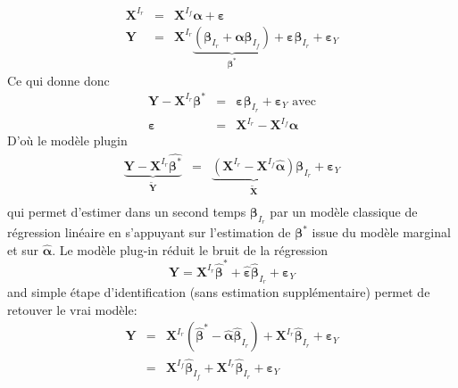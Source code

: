 \documentclass[12pt,a4paper]{report}
\begin{document}
\begin{eqnarray}
			\boldsymbol{X}^{I_r}&=&\boldsymbol{X}^{I_f}\boldsymbol{\alpha}+\boldsymbol{\varepsilon} \\
			\boldsymbol{Y}&=& \boldsymbol{X}^{I_r}\underbrace{(\boldsymbol{\beta}_{I_r}+\boldsymbol{\alpha}\boldsymbol{\beta}_{I_f})}_{\boldsymbol{\beta}^*}+\boldsymbol{\varepsilon}\boldsymbol{\beta}_{I_r}+\boldsymbol{\varepsilon}_Y 
					\end{eqnarray}		 
Ce qui donne donc
		\begin{eqnarray}
			\boldsymbol{Y}- \boldsymbol{X}^{I_r}\boldsymbol{\beta}^*&=&\boldsymbol{\varepsilon}\boldsymbol{\beta}_{I_r}+\boldsymbol{\varepsilon}_Y \textrm{ avec}\\
			\boldsymbol{\varepsilon}&=&\boldsymbol{X}^{I_r}-\boldsymbol{X}^{I_f}\boldsymbol{\alpha}
		\end{eqnarray}		 
D'où le modèle plugin 
		\begin{eqnarray}
			\underbrace{\boldsymbol{Y}- \boldsymbol{X}^{I_r}\hat{\boldsymbol{\beta}^*}}_{\tilde{\boldsymbol{Y}}}&=&\underbrace{(\boldsymbol{X}^{I_r}-\boldsymbol{X}^{I_f}\hat{\boldsymbol{\alpha}})}_{\tilde{\boldsymbol{X}}}\boldsymbol{\beta}_{I_r}+\boldsymbol{\varepsilon}_Y \\
		\end{eqnarray}
		qui permet d'estimer dans un second temps $\boldsymbol{\beta}_{I_r}$ par un modèle classique de régression linéaire en s'appuyant sur l'estimation de $\boldsymbol{\beta}^*$ issue du modèle marginal et sur $\hat{\boldsymbol{\alpha}}$.
		Le modèle plug-in réduit le bruit de la régression
		\begin{equation}
			\boldsymbol{Y}= \boldsymbol{X}^{I_r}\hat{\boldsymbol{\beta}}^* + \hat{\boldsymbol{\varepsilon}}\hat{\boldsymbol{\beta}}_{I_r}+\boldsymbol{\varepsilon}_Y 
		\end{equation}
		and simple étape d'identification (sans estimation supplémentaire) permet de retouver le vrai modèle:
		\begin{eqnarray}
			\boldsymbol{Y}&=& \boldsymbol{X}^{I_r}(\hat{\boldsymbol{\beta}}^*-\hat{\boldsymbol{\alpha}}\hat{\boldsymbol{\beta}}_{I_r}) + \boldsymbol{X}^{I_r}\hat{\boldsymbol{\beta}}_{I_r}+\boldsymbol{\varepsilon}_Y \\
			&=&\boldsymbol{X}^{I_f}\hat{\boldsymbol{\beta}}_{I_f}+\boldsymbol{X}^{I_r}\hat{\boldsymbol{\beta}}_{I_r}+\boldsymbol{\varepsilon}_Y
		\end{eqnarray}
	
\end{document}
